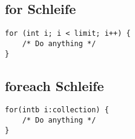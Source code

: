 \subsection{for Schleife}
\begin{lstlisting}[caption=for Schleife]
for (int i; i < limit; i++) {
    /* Do anything */
}
\end{lstlisting}

\subsection{foreach Schleife}
\begin{lstlisting}[caption=foreach Schleife]
for(intb i:collection) {
    /* Do anything */
}
\end{lstlisting}
